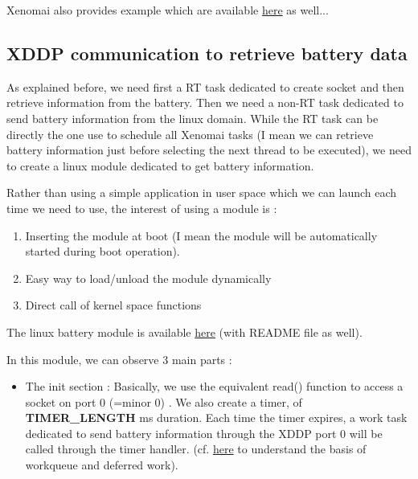 \documentclass[12pt,hidelinks]{article}
\begin{document}
{ Xenomai also provides example which are available \href{https://xenomai.org/documentation/xenomai-3/html/xeno3prm/xddp-echo_8c-example.html}{here} as well...

	\subsection{XDDP communication to retrieve battery data}
    	
	As explained before, we need first a RT task dedicated to create socket and then retrieve information from the battery. Then we need a non-RT task dedicated to send battery information from the linux domain. While the RT task can be directly the one use to schedule all Xenomai tasks (I mean we can retrieve battery information just before selecting the next thread to be executed), we need to create a linux module dedicated to get battery information.
	
	Rather than using a simple application in user space which we can launch each time we need to use, the interest of using a module is :
	\begin{enumerate}
	    \item Inserting the module at boot (I mean the module will be automatically started during boot operation).
	    \item Easy way to load/unload the module dynamically
	    \item Direct call of kernel space functions
	\end{enumerate}
	
	The linux battery module is available \href{https://github.com/skyultime/M2_ERTS_Project_xenomai_edh/tree/dev/SourceCode/linuxBattModule}{here} (with README file as well).\newline
	
	In this module, we can observe 3 main parts :
	\begin{itemize}
	    \item The init section : Basically, we use the equivalent read() function to access a socket on port 0 (=minor 0) . We also create a timer, of \textbf{TIMER\_LENGTH} ms duration. Each time the timer expires, a work task dedicated to send battery information through the XDDP port 0 will be called through the timer handler. (cf. \href{https://linux-kernel-labs.github.io/refs/heads/master/labs/deferred_work.html}{here} to understand the basis of workqueue and deferred work).
	    

\end{itemize}}
\end{document}

